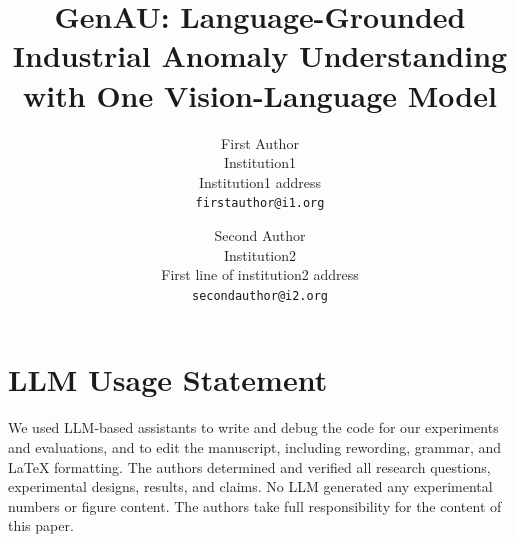 \documentclass[10pt,twocolumn,letterpaper]{article}
\title{GenAU: Language-Grounded Industrial Anomaly Understanding with One Vision-Language Model}
\author{First Author\\
Institution1\\
Institution1 address\\
{\tt\small firstauthor@i1.org}
\and
Second Author\\
Institution2\\
First line of institution2 address\\
{\tt\small secondauthor@i2.org}
}
\begin{document}
\maketitle









\section*{LLM Usage Statement}
We used LLM-based assistants to write and debug the code for our experiments and evaluations, and to edit the manuscript, including rewording, grammar, and LaTeX formatting. The authors determined and verified all research questions, experimental designs, results, and claims. No LLM generated any experimental numbers or figure content. The authors take full responsibility for the content of this paper.


{
    \small
    
    
}

\end{document}
